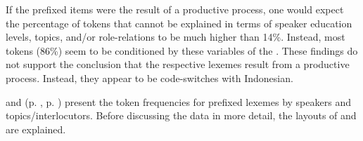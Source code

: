 If the prefixed items were the result of a productive  process, one would expect the percentage of tokens that cannot be explained in terms of speaker education levels, topics, and/or role-relations to be much higher than 14\%. Instead, most tokens (86\%) seem to be conditioned by these variables of the . These findings do not support the conclusion that the respective lexemes result from a productive  process. Instead, they appear to be code-switches with Indonesian.



 and  (p. \pageref{Table_3.5}, p. \pageref{Figure_3.1}) present the token frequencies for prefixed lexemes by speakers and topics/interlocutors. Before discussing the data in more detail, the layouts of  and  are explained.

